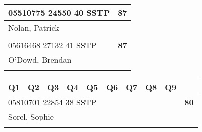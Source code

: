 \documentclass[a4paper,12pt]{article}
\begin{document}
\begin{tabular}{
   |p{9mm}|
    p{9mm}|
    p{9mm}|
    p{9mm}|
    p{9mm}|
    p{9mm}|
    p{9mm}|
    p{9mm}|
    p{9mm}|
    p{9mm}|}
\hline\hline
\multicolumn{9}{|l|}{05510775 24550 40 SSTP} & \textbf{87} \\
\hline
\multicolumn{10}{|l|}{Nolan, Patrick} \\
\hline
   \vrule height8mm width0pt depth2mm 
      &    &    &    &    &    &    &    &    &     \\
\hline\hline
\multicolumn{9}{|l|}{05616468 27132 41 SSTP} & \textbf{87} \\
\hline
\multicolumn{10}{|l|}{O'Dowd, Brendan} \\
\hline
   \vrule height8mm width0pt depth2mm 
      &    &    &    &    &    &    &    &    &     \\
\hline\hline
\end{tabular}
\newpage

\begin{tabular}{
   |p{9mm}|
    p{9mm}|
    p{9mm}|
    p{9mm}|
    p{9mm}|
    p{9mm}|
    p{9mm}|
    p{9mm}|
    p{9mm}|
    p{9mm}|}
\hline\hline
Q1 & Q2 & Q3 & Q4 & Q5 & Q6 & Q7 & Q8 & Q9 &     \\
\hline\hline
\multicolumn{9}{|l|}{05810701 22854 38 SSTP} & \textbf{80} \\
\hline
\multicolumn{10}{|l|}{Sorel, Sophie} \\
\hline
   \vrule height8mm width0pt depth2mm 
      &    &    &    &    &    &    &    &    &     \\
\hline\hline
\end{tabular}
\end{document}
